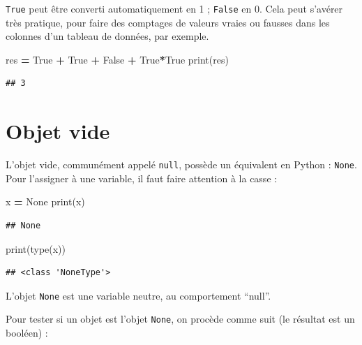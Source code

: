\documentclass[12pt,]{book}
\newenvironment{Shaded}{\begin{snugshade}}{\end{snugshade}}
\newcommand{\VariableTok}[1]{\textcolor[rgb]{0.00,0.00,0.00}{#1}}
\newcommand{\OperatorTok}[1]{\textcolor[rgb]{0.81,0.36,0.00}{\textbf{#1}}}
\newcommand{\BuiltInTok}[1]{#1}
\newcommand{\NormalTok}[1]{#1}
\numberwithin{equation}{section}
\numberwithin{countremarque}{section}
\begin{document}
\texttt{True} peut être converti automatiquement en 1 ; \texttt{False}
en 0. Cela peut s'avérer très pratique, pour faire des comptages de
valeurs vraies ou fausses dans les colonnes d'un tableau de données, par
exemple.

\begin{Shaded}
\begin{Highlighting}[]
\NormalTok{res }\OperatorTok{=} \VariableTok{True} \OperatorTok{+} \VariableTok{True} \OperatorTok{+} \VariableTok{False} \OperatorTok{+} \VariableTok{True}\OperatorTok{*}\VariableTok{True}
\BuiltInTok{print}\NormalTok{(res)}
\end{Highlighting}
\end{Shaded}

\begin{lstlisting}
## 3
\end{lstlisting}

\section{Objet vide}\label{objet-vide}

L'objet vide, communément appelé \texttt{null}, possède un équivalent en
Python : \texttt{None}. Pour l'assigner à une variable, il faut faire
attention à la casse :

\begin{Shaded}
\begin{Highlighting}[]
\NormalTok{x }\OperatorTok{=} \VariableTok{None}
\BuiltInTok{print}\NormalTok{(x)}
\end{Highlighting}
\end{Shaded}

\begin{lstlisting}
## None
\end{lstlisting}

\begin{Shaded}
\begin{Highlighting}[]
\BuiltInTok{print}\NormalTok{(}\BuiltInTok{type}\NormalTok{(x))}
\end{Highlighting}
\end{Shaded}

\begin{lstlisting}
## <class 'NoneType'>
\end{lstlisting}

L'objet \texttt{None} est une variable neutre, au comportement ``null''.

Pour tester si un objet est l'objet \texttt{None}, on procède comme suit
(le résultat est un booléen) :
\end{document}
